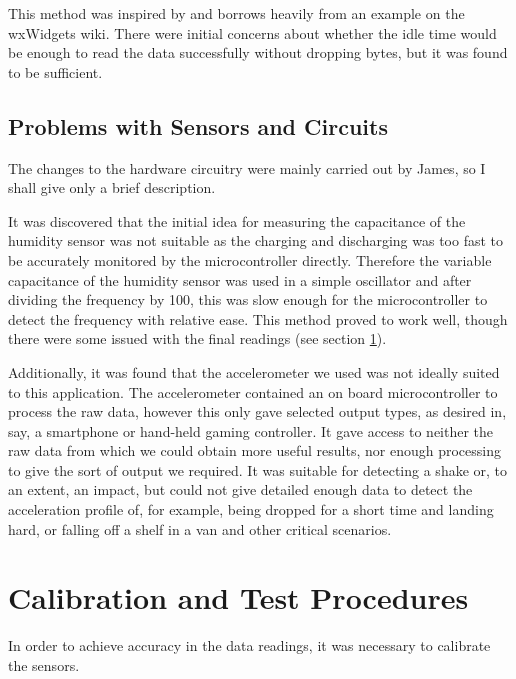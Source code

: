 \documentclass[a4paper,10pt]{article}  %
\begin{document}
This method was inspired by and borrows heavily from an example on the
wxWidgets wiki\cite{rendloop}. There were initial concerns about
whether the idle time would be enough to read the data successfully
without dropping bytes, but it was found to be sufficient.

\subsection{Problems with Sensors and Circuits}

The changes to the hardware circuitry were mainly carried out by
James, so I shall give only a brief description.

It was discovered that the initial idea for measuring the capacitance
of the humidity sensor was not suitable as the charging and
discharging was too fast to be accurately monitored by the
microcontroller directly. Therefore the variable capacitance of the
humidity sensor was used in a simple oscillator and after dividing the
frequency by 100, this was slow enough for the microcontroller to
detect the frequency with relative ease. This method proved to work
well, though there were some issued with the final readings (see
section \ref{sec:test-procedures}).

Additionally, it was found that the accelerometer we used was not
ideally suited to this application. The accelerometer contained an
on board microcontroller to process the raw data, however this only
gave selected output types, as desired in, say, a smartphone or
hand-held gaming controller. It gave access to neither the raw data
from which we could obtain more useful results, nor enough processing
to give the sort of output we required. It was suitable for detecting
a shake or, to an extent, an impact, but could not give detailed
enough data to detect the acceleration profile of, for example, being
dropped for a short time and landing hard, or falling off a shelf in a
van and other critical scenarios.

\section{Calibration and Test Procedures}
\label{sec:test-procedures}

In order to achieve accuracy in the data readings, it was necessary to
calibrate the sensors.
\end{document}
